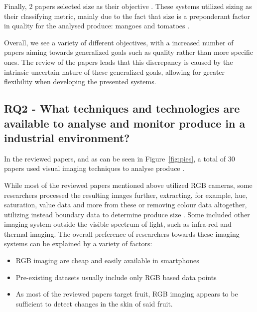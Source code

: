 \documentclass[conference]{IEEEtran}
\begin{document}
Finally, 2 papers selected size as their objective \cite{Bautista2020-ye} \cite{Vo2019}. These systems utilized sizing as their classifying metric, mainly due to the fact that size is a preponderant factor in quality for the analysed produce: mangoes \cite{Vo2019} and tomatoes \cite{Bautista2020-ye}.

Overall, we see a variety of different objectives, with a increased number of papers aiming towards generalized goals such as quality rather than more specific ones. The review of the papers leads that this discrepancy is caused by the intrinsic uncertain nature of these generalized goals, allowing for greater flexibility when developing the presented systems.

\subsection{RQ2 - What techniques and technologies are available to analyse and monitor produce in a industrial environment?}

In the reviewed papers, and as can be seen in Figure~\ref{fig:pies}, a total of 30 papers used visual imaging techniques to analyse produce \cite{Choi2018-xp} \cite{Hamza2018-sc} \cite{Shi2019} \cite{Pise2018} \cite{GarillosManliguez2021} \cite{Annaland2020} \cite{Nipas2022} \cite{Indrabayu2019} \cite{Vo2019} \cite{Basri2018} \cite{Kumar2021} \cite{Pande2019-fz} \cite{Nie2019-hx} \cite{Bautista2020-ye} \cite{Mohtar2019-ru} \cite{Saragih2021-wu} \cite{Mishra2022-kz} \cite{Anita2020-nm} \cite{Castro2019-hk} \cite{Muladi2019-jp} \cite{Al_Haque2021-fw} \cite{Prabhu2022-zh} \cite{Park2021-de} \cite{Stasenko2021-jt} \cite{Azizah2017} \cite{Hasan2021} \cite{Zhang2020} \cite{MiraeiAshtiani2021} \cite{EAngelia2021} \cite{Bhole2020}.

While most of the reviewed papers mentioned above utilized RGB cameras, some researchers processed the resulting images further, extracting, for example, hue, saturation, value data and more from these \cite{Indrabayu2019} \cite{Castro2019-hk} or removing colour data altogether, utilizing instead boundary data to determine produce size \cite{Vo2019}. Some included other imaging system outside the visible spectrum of light, such as infra-red \cite{Annaland2020} and thermal imaging\cite{Bhole2020}. The overall preference of researchers towards these imaging systems can be explained by a variety of factors:

\begin{itemize}
	\item RGB imaging are cheap and easily available in smartphones
	\item Pre-existing datasets usually include only RGB based data points
	\item As most of the reviewed papers target fruit, RGB imaging appears to be sufficient to detect changes in the skin of said fruit.
\end{itemize}
\end{document}
